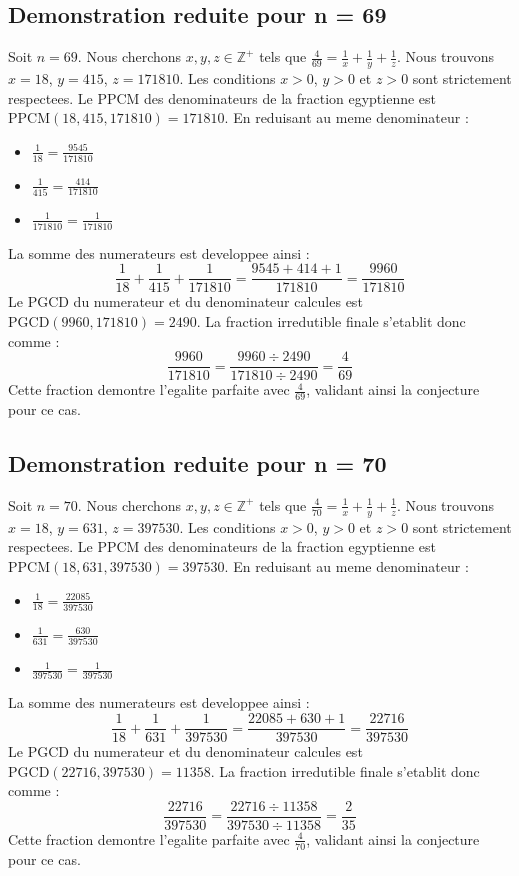 \documentclass[11pt,a4paper]{article}
\begin{document}
\subsection{Demonstration reduite pour n = 69}
Soit $n = 69$. Nous cherchons $x, y, z \in \mathbb{Z}^{+}$ tels que $\frac{4}{69} = \frac{1}{x} + \frac{1}{y} + \frac{1}{z}$.
Nous trouvons $x = 18$, $y = 415$, $z = 171810$.
Les conditions $x > 0$, $y > 0$ et $z > 0$ sont strictement respectees.
Le PPCM des denominateurs de la fraction egyptienne est $\text{PPCM}(18, 415, 171810) = 171810$.
En reduisant au meme denominateur :
\begin{itemize}
    \item $\frac{1}{18} = \frac{9545}{171810}$
    \item $\frac{1}{415} = \frac{414}{171810}$
    \item $\frac{1}{171810} = \frac{1}{171810}$
\end{itemize}
La somme des numerateurs est developpee ainsi :
$$ \frac{1}{18} + \frac{1}{415} + \frac{1}{171810} = \frac{9545 + 414 + 1}{171810} = \frac{9960}{171810} $$
Le PGCD du numerateur et du denominateur calcules est $\text{PGCD}(9960, 171810) = 2490$.
La fraction irredutible finale s'etablit donc comme :
$$ \frac{9960}{171810} = \frac{9960 \div 2490}{171810 \div 2490} = \frac{4}{69} $$
Cette fraction demontre l'egalite parfaite avec $\frac{4}{69}$, validant ainsi la conjecture pour ce cas.

\subsection{Demonstration reduite pour n = 70}
Soit $n = 70$. Nous cherchons $x, y, z \in \mathbb{Z}^{+}$ tels que $\frac{4}{70} = \frac{1}{x} + \frac{1}{y} + \frac{1}{z}$.
Nous trouvons $x = 18$, $y = 631$, $z = 397530$.
Les conditions $x > 0$, $y > 0$ et $z > 0$ sont strictement respectees.
Le PPCM des denominateurs de la fraction egyptienne est $\text{PPCM}(18, 631, 397530) = 397530$.
En reduisant au meme denominateur :
\begin{itemize}
    \item $\frac{1}{18} = \frac{22085}{397530}$
    \item $\frac{1}{631} = \frac{630}{397530}$
    \item $\frac{1}{397530} = \frac{1}{397530}$
\end{itemize}
La somme des numerateurs est developpee ainsi :
$$ \frac{1}{18} + \frac{1}{631} + \frac{1}{397530} = \frac{22085 + 630 + 1}{397530} = \frac{22716}{397530} $$
Le PGCD du numerateur et du denominateur calcules est $\text{PGCD}(22716, 397530) = 11358$.
La fraction irredutible finale s'etablit donc comme :
$$ \frac{22716}{397530} = \frac{22716 \div 11358}{397530 \div 11358} = \frac{2}{35} $$
Cette fraction demontre l'egalite parfaite avec $\frac{4}{70}$, validant ainsi la conjecture pour ce cas.
\end{document}
